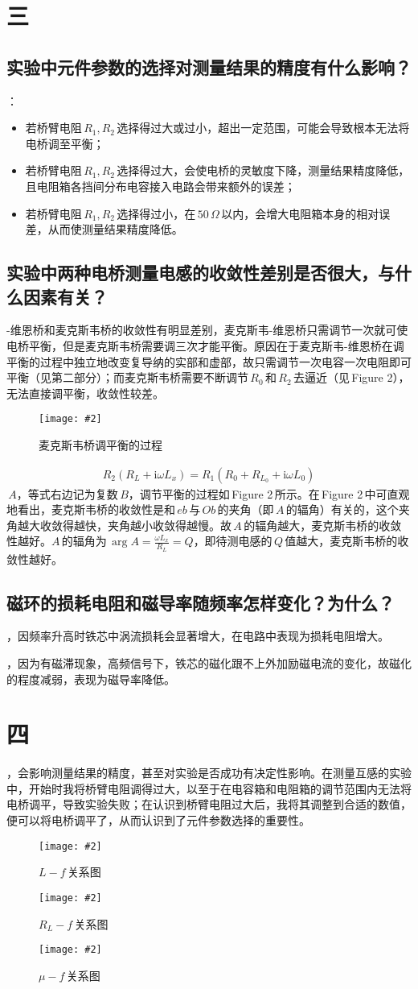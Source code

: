 \documentclass[a4paper,12pt]{article}
\newcommand{\im}{\mathrm{i}}
\newcommand{\om}{\,\Omega}
\newcommand{\sct}{\section}
\newcommand{\ssct}{\subsection}
\newcommand{\sj}{\quad\!\!\!\!\:}
\newcommand{\eT}{\;\;\;\;}
\newcommand{\tp}{\,Figure\,\,}
\newcommand{\alg}[1]{\begin{align*}{#1}\end{align*}}
\newcommand{\fg}[3]{\begin{figure}[h]
\centering
\texttt{[image: \#2]}
\caption{#3}
\end{figure}}
\begin{document}
\begin{CJK*}{UTF8}{gbsn}
\begin{spacing}{1.2}
\setcounter{section}{3}
\setcounter{subsection}{0}
\sct*{三}
\ssct{实验中元件参数的选择对测量结果的精度有什么影响？}
：
\begin{itemize}
\item 若桥臂电阻$\,R_1,R_2\,$选择得过大或过小，超出一定范围，可能会导致根本无法将电桥调至平衡；
\item 若桥臂电阻$\,R_1,R_2\,$选择得过大，会使电桥的灵敏度下降，测量结果精度降低，且电阻箱各挡间分布电容接入电路会带来额外的误差；
\item 若桥臂电阻$\,R_1,R_2\,$选择得过小，在$\,50\om\,$以内，会增大电阻箱本身的相对误差，从而使测量结果精度降低。
\end{itemize}

\ssct{实验中两种电桥测量电感的收敛性差别是否很大，与什么因素有关？}
-维恩桥和麦克斯韦桥的收敛性有明显差别，麦克斯韦-维恩桥只需调节一次就可使电桥平衡，但是麦克斯韦桥需要调三次才能平衡。原因在于麦克斯韦-维恩桥在调平衡的过程中独立地改变复导纳的实部和虚部，故只需调节一次电容一次电阻即可平衡（见第二部分）；而麦克斯韦桥需要不断调节$\,R_0\,$和$\,R_2\,$去逼近（见\tp2），无法直接调平衡，收敛性较差。\par
\fg{0.8}{5}{麦克斯韦桥调平衡的过程}
\alg{
R_2(R_L+\im\omega L_x)=R_1(R_0+R_{L_0}+\im\omega L_0)
}
$\,A$，等式右边记为复数$\,B$，调节平衡的过程如\tp2\,所示。在\tp2\,中可直观地看出，麦克斯韦桥的收敛性是和$\,eb\,$与$\,Ob\,$的夹角（即$\,A\,$的辐角）有关的，这个夹角越大收敛得越快，夹角越小收敛得越慢。故$\,A\,$的辐角越大，麦克斯韦桥的收敛性越好。$A\,$的辐角为$\,\arg{A}=\frac{\omega L_x}{R_L}=Q$，即待测电感的$\,Q\,$值越大，麦克斯韦桥的收敛性越好。

\ssct{磁环的损耗电阻和磁导率随频率怎样变化？为什么？}
，因频率升高时铁芯中涡流损耗会显著增大，在电路中表现为损耗电阻增大。\par
{}，因为有磁滞现象，高频信号下，铁芯的磁化跟不上外加励磁电流的变化，故磁化的程度减弱，表现为磁导率降低。


\setcounter{section}{4}
\setcounter{subsection}{0}
\sct*{四}
，会影响测量结果的精度，甚至对实验是否成功有决定性影响。在测量互感的实验中，开始时我将桥臂电阻调得过大，以至于在电容箱和电阻箱的调节范围内无法将电桥调平，导致实验失败；在认识到桥臂电阻过大后，我将其调整到合适的数值，便可以将电桥调平了，从而认识到了元件参数选择的重要性。

\fg{0.35}{1.JPG}{$L-f\,$关系图}
\fg{0.35}{2.JPG}{$R_L-f\,$关系图}
\fg{0.35}{3.JPG}{$\mu-f\,$关系图}



\end{spacing}
\end{CJK*}
\end{document}
